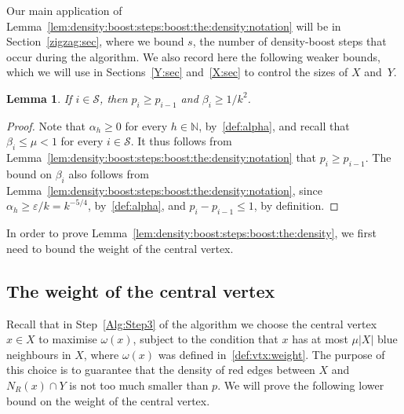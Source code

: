 \documentclass[12pt,reqno]{amsart}
\newtheorem{lemma}[theorem]{Lemma}
\theoremstyle{definition}
\theoremstyle{remark}
\newcommand\N{\mathbb{N}}
\def\cS{\mathcal{S}}
\newcommand\eps{\varepsilon}
\renewcommand{\le}{\leqslant}
\renewcommand{\ge}{\geqslant}
\def\eps{\varepsilon}
\def\N{\mathbb{N}}
\begin{document}
Our main application of Lemma~\ref{lem:density:boost:steps:boost:the:density:notation} will be in Section~\ref{zigzag:sec}, where we bound $s$, the number of density-boost steps that occur during the algorithm. 
We also record here the following weaker bounds, which we will use in Sections~\ref{Y:sec} and~\ref{X:sec} to control the sizes of $X$ and~$Y$.  

\begin{lemma}\label{lem:density:boost:weak}
If\/ $i \in \cS$, then\/ $p_i \ge p_{i-1}$ and\/ $\beta_i \ge 1/k^2$.
\end{lemma}

\begin{proof}
Note that $\alpha_h \ge 0$ for every $h \in \N$, by~\eqref{def:alpha}, and recall that $\beta_i \le \mu < 1$ for every $i \in \cS$. It thus follows from Lemma~\ref{lem:density:boost:steps:boost:the:density:notation} that $p_i \ge p_{i-1}$. The bound on $\beta_i$ also follows from Lemma~\ref{lem:density:boost:steps:boost:the:density:notation}, %
since $\alpha_h \ge \eps/k = k^{-5/4}$, by~\eqref{def:alpha}, and $p_i - p_{i-1} \le 1$, by definition. 
\end{proof}


In order to prove Lemma~\ref{lem:density:boost:steps:boost:the:density}, we first need to bound the weight of the central vertex.

\subsection{The weight of the central vertex} 

Recall that in Step~\ref{Alg:Step3} of the algorithm we choose the central vertex $x \in X$ to maximise $\omega(x)$, subject to the condition that $x$ has at most $\mu |X|$ blue neighbours in $X$, where $\omega(x)$ was defined in~\eqref{def:vtx:weight}. The purpose of this choice is to guarantee that the density of red edges between $X$ and $N_R(x) \cap Y$ is not too much smaller than $p$. We will prove the following lower bound on the weight of the central vertex. 
\end{document}
